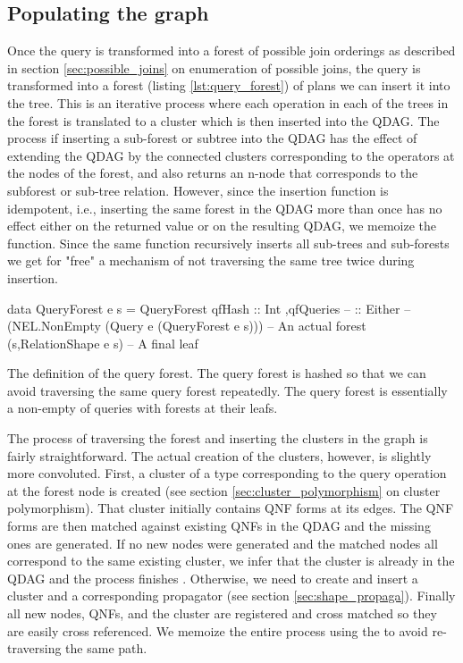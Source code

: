 \subsection{Populating the graph}

Once the query is transformed into a forest of possible join orderings
as described in section \ref{sec:possible_joins} on enumeration of
possible joins, the query is transformed into a forest (listing
\ref{lst:query_forest}) of plans we can insert it into the tree. This
is an iterative process where each operation in each of the trees in
the forest is translated to a cluster which is then inserted into the
QDAG. The process if inserting a sub-forest or subtree into the QDAG
has the effect of extending the QDAG by the connected clusters
corresponding to the operators at the nodes of the forest, and also
returns an n-node that corresponds to the subforest or sub-tree
relation. However, since the insertion function is idempotent, i.e.,
inserting the same forest in the QDAG more than once has no effect
either on the returned value or on the resulting QDAG, we memoize the
function. Since the same function recursively inserts all sub-trees
and sub-forests we get for "free" a mechanism of not traversing the
same tree twice during insertion.

\begin{code}
  \begin{haskellcode}
    data QueryForest e s =
      QueryForest
      { qfHash :: Int
        ,qfQueries --
        :: Either --
        (NEL.NonEmpty (Query e (QueryForest e s))) -- An actual forest
        (s,RelationShape e s) -- A final leaf
      }
  \end{haskellcode}

  \caption{\label{lst:query_forest}The definition of the query forest. The
    query forest is hashed so that we can avoid traversing the same
    query forest repeatedly. The query forest is essentially a
    non-empty of queries with forests at their leafs.}
\end{code}

The process of traversing the forest and inserting the clusters in the
graph is fairly straightforward. The actual creation of the clusters,
however, is slightly more convoluted. First, a cluster of a type
corresponding to the query operation at the forest node is created
(see section \ref{sec:cluster_polymorphism} on cluster
polymorphism). That cluster initially contains QNF forms at its
edges. The QNF forms are then matched against existing QNFs in the
QDAG and the missing ones are generated. If no new nodes were
generated and the matched nodes all correspond to the same existing
cluster, we infer that the cluster is already in the QDAG and the
process finishes . Otherwise, we need to create and insert a cluster
and a corresponding propagator (see section
\ref{sec:shape_propaga}). Finally all new nodes, QNFs, and the cluster
are registered and cross matched so they are easily cross referenced.
We memoize the entire process using the  to avoid
re-traversing the same path.

